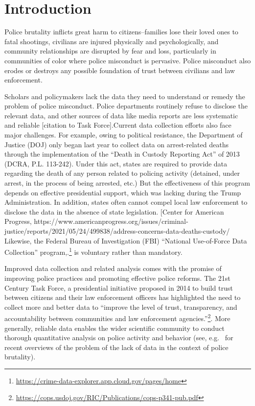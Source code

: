 

\section{Introduction} \label{sec:intro}


Police brutality inflicts great harm to citizens--families lose their loved
ones to fatal shootings, civilians are injured physically and psychologically,
and community relationships are disrupted by fear and loss, particularly in
communities of color where police misconduct is pervasive. Police misconduct
also erodes or destroys any possible foundation of trust between civilians and
law enforcement. 

Scholars and policymakers lack the data they need to understand or remedy the
problem of police misconduct. Police departments routinely refuse to disclose
the relevant data, and other sources of data like media reports are less
systematic and reliable [citation to Task Force].Current data collection
efforts also face major challenges. For example, owing to political resistance,
the Department of Justice (DOJ) only began last year to collect data on
arrest-related deaths through the implementation of the ``Death in Custody
Reporting Act'' of 2013 (DCRA, P.L. 113-242). Under this act, states are
required to provide data regarding the death of any person related to policing
activity (detained, under arrest, in the process of being arrested, etc.) But
the effectiveness of this program depends on effective presidential support,
which was lacking during the Trump Administration. In addition, states often
cannot compel local law enforcement to disclose the data in the absence of
state legislation. [Center for American Progress,
https://www.americanprogress.org/issues/criminal-justice/reports/2021/05/24/499838/address-concerns-data-deaths-custody/
Likewise, the Federal Bureau of Investigation (FBI) ``National Use-of-Force
Data Collection''
program,.\footnote{\url{https://crime-data-explorer.app.cloud.gov/pages/home}}
is voluntary rather than mandatory. 

Improved data collection and related analysis comes with the promise of
improving  police practices and promoting effective police reforms. The 21st
Century Task Force, a presidential initiative proposed in 2014 to build trust
between citizens and their law enforcement officers has highlighted the need to
collect more and better data to ``improve the level of trust, transparency, and
accountability between communities and law enforcement
agencies.''\footnote{\url{https://cops.usdoj.gov/RIC/Publications/cops-p341-pub.pdf}}.
More generally, reliable data enables the wider scientific community to conduct
thorough quantitative analysis on police activity and behavior 
(see, e.g.~\citet{peeples2019data,peeples2020data} for recent overviews of the problem of
the lack of data in the context of police brutality).

